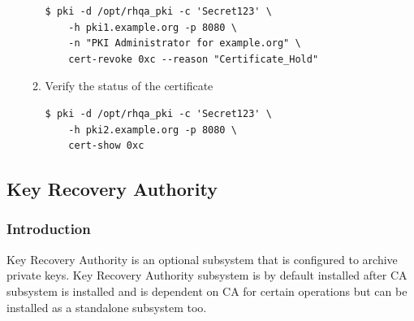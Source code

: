 \documentclass[a4paper]{article}
\begin{document}
\begin{enumerate}[label*=\arabic*.]
\begin{enumerate}[label*=\arabic*.]
\begin{lstlisting}[style=bashInputStyle]
$ pki -d /opt/rhqa_pki -c 'Secret123' \
    -h pki1.example.org -p 8080 \
    -n "PKI Administrator for example.org" \
    cert-revoke 0xc --reason "Certificate_Hold"
                    \end{lstlisting}
            \item Verify the status of the certificate
                \begin{lstlisting}[style=bashInputStyle]
$ pki -d /opt/rhqa_pki -c 'Secret123' \
    -h pki2.example.org -p 8080 \
    cert-show 0xc
                \end{lstlisting}
        \end{enumerate}
    \end{enumerate}
\subsection{Key Recovery Authority}
\subsubsection{Introduction}
Key Recovery Authority is an optional subsystem that is configured to archive private keys. Key Recovery Authority
subsystem is by default installed after CA subsystem is installed and is dependent on CA for certain operations
but can be installed as a standalone subsystem too.
\end{document}
